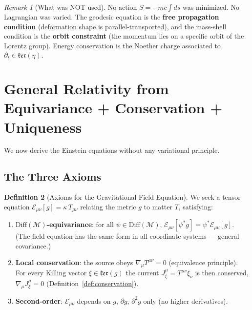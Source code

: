 \documentclass[11pt,twocolumn]{article}
\theoremstyle{plain}\newtheorem{theorem}{Theorem}\newtheorem{proposition}[theorem]{Proposition}\newtheorem{corollary}[theorem]{Corollary}\newtheorem{lemma}[theorem]{Lemma}
\theoremstyle{definition}\newtheorem{definition}[theorem]{Definition}
\theoremstyle{remark}\newtheorem{remark}[theorem]{Remark}
\newcommand{\Diff}{\mathrm{Diff}}
\begin{document}
\begin{remark}[What was NOT used]
No action $S = -mc\int ds$ was minimized. No Lagrangian was varied. The geodesic equation is the \textbf{free propagation condition} (deformation shape is parallel-transported), and the mass-shell condition is the \textbf{orbit constraint} (the momentum lies on a specific orbit of the Lorentz group). Energy conservation is the Noether charge associated to $\partial_t \in \mathfrak{ker}(\eta)$.
\end{remark}


\section{General Relativity from Equivariance + Conservation + Uniqueness}
\label{sec:GR}

We now derive the Einstein equations without any variational principle.

\subsection{The Three Axioms}

\begin{definition}[Axioms for the Gravitational Field Equation]\label{def:axioms}
We seek a tensor equation $\mathcal{E}_{\mu\nu}[g] = \kappa\, T_{\mu\nu}$ relating the metric $g$ to matter $T$, satisfying:
\begin{enumerate}[label=(A\arabic*)]
    \item \textbf{$\Diff(\mathcal{M})$-equivariance}: for all $\psi \in \Diff(\mathcal{M})$, $\mathcal{E}_{\mu\nu}[\psi^*g] = \psi^*\mathcal{E}_{\mu\nu}[g]$. (The field equation has the same form in all coordinate systems --- general covariance.)
    \item \textbf{Local conservation}: the source obeys $\nabla_\mu T^{\mu\nu} = 0$ (equivalence principle). For every Killing vector $\xi \in \mathfrak{ker}(g)$ the current $J^\mu_\xi = T^{\mu\nu}\xi_\nu$ is then conserved, $\nabla_\mu J^\mu_\xi = 0$ (Definition~\ref{def:conservation}).
    \item \textbf{Second-order}: $\mathcal{E}_{\mu\nu}$ depends on $g$, $\partial g$, $\partial^2 g$ only (no higher derivatives).
\end{enumerate}
\end{definition}
\end{document}
